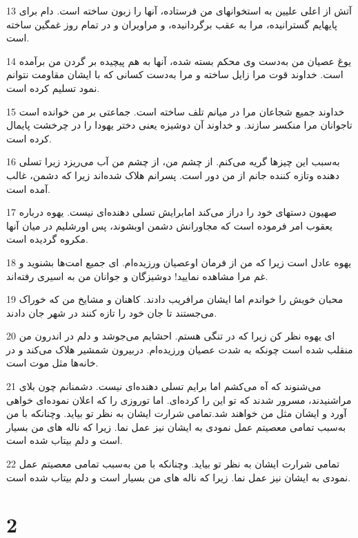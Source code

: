 \par 13 آتش از اعلی علیین به استخوانهای من فرستاده، آنها را زبون ساخته است. دام برای پایهایم گسترانیده، مرا به عقب برگردانیده، و مراویران و در تمام روز غمگین ساخته است.
\par 14 یوغ عصیان من به‌دست وی محکم بسته شده، آنها به هم پیچیده بر گردن من برآمده است. خداوند قوت مرا زایل ساخته و مرا به‌دست کسانی که با ایشان مقاومت نتوانم نمود تسلیم کرده است.
\par 15 خداوند جمیع شجاعان مرا در میانم تلف ساخته است. جماعتی بر من خوانده است تاجوانان مرا منکسر سازند. و خداوند آن دوشیزه یعنی دختر یهودا را در چرخشت پایمال کرده است.
\par 16 به‌سبب این چیزها گریه می‌کنم. از چشم من، از چشم من آب می‌ریزد زیرا تسلی دهنده وتازه کننده جانم از من دور است. پسرانم هلاک شده‌اند زیرا که دشمن، غالب آمده است.
\par 17 صهیون دستهای خود را دراز می‌کند امابرایش تسلی دهنده‌ای نیست. یهوه درباره یعقوب امر فرموده است که مجاورانش دشمن اوبشوند، پس اورشلیم در میان آنها مکروه گردیده است.
\par 18 یهوه عادل است زیرا که من از فرمان اوعصیان ورزیده‌ام. ای جمیع امت‌ها بشنوید و غم مرا مشاهده نمایید! دوشیزگان و جوانان من به اسیری رفته‌اند.
\par 19 محبان خویش را خواندم اما ایشان مرافریب دادند. کاهنان و مشایخ من که خوراک می‌جستند تا جان خود را تازه کنند در شهر جان دادند.
\par 20 ‌ای یهوه نظر کن زیرا که در تنگی هستم. احشایم می‌جوشد و دلم در اندرون من منقلب شده است چونکه به شدت عصیان ورزیده‌ام. دربیرون شمشیر هلاک می‌کند و در خانه‌ها مثل موت است.
\par 21 می‌شنوند که آه می‌کشم اما برایم تسلی دهنده‌ای نیست. دشمنانم چون بلای مراشنیدند، مسرور شدند که تو این را کرده‌ای. اما توروزی را که اعلان نموده‌ای خواهی آورد و ایشان مثل من خواهند شد.تمامی شرارت ایشان به نظر تو بیاید. وچنانکه با من به‌سبب تمامی معصیتم عمل نمودی به ایشان نیز عمل نما. زیرا که ناله های من بسیار است و دلم بیتاب شده است.
\par 22 تمامی شرارت ایشان به نظر تو بیاید. وچنانکه با من به‌سبب تمامی معصیتم عمل نمودی به ایشان نیز عمل نما. زیرا که ناله های من بسیار است و دلم بیتاب شده است.
 
\chapter{2}

